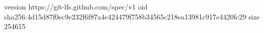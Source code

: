 version https://git-lfs.github.com/spec/v1
oid sha256:4d15d87f0ec9e232f6f87a4e424479f758b34565c218ea13981c917e4420fc29
size 254615
